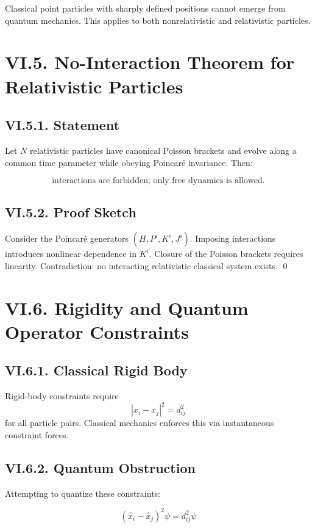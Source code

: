 \documentclass[12pt,oneside]{book}
\theoremstyle{plain}
\theoremstyle{definition}
\begin{document}
Classical point particles with sharply defined positions cannot emerge from quantum mechanics. This applies to both nonrelativistic and relativistic particles.

\section{VI.5. No-Interaction Theorem for Relativistic Particles}

\subsection*{VI.5.1. Statement}

Let $N$ relativistic particles have canonical Poisson brackets and evolve along a common time parameter while obeying Poincaré invariance. Then:

\[
\text{interactions are forbidden; only free dynamics is allowed.}
\]

\subsection*{VI.5.2. Proof Sketch}

Consider the Poincaré generators $(H,P^i,K^i,J^i)$. Imposing interactions introduces nonlinear dependence in $K^i$. Closure of the Poisson brackets requires linearity. Contradiction: no interacting relativistic classical system exists. \qed

\section{VI.6. Rigidity and Quantum Operator Constraints}

\subsection*{VI.6.1. Classical Rigid Body}

Rigid-body constraints require
\[
|x_i - x_j|^2 = d_{ij}^2
\]
for all particle pairs. Classical mechanics enforces this via instantaneous constraint forces.

\subsection*{VI.6.2. Quantum Obstruction}

Attempting to quantize these constraints:

\[
(\widehat{x}_i - \widehat{x}_j)^2 \psi = d_{ij}^2 \psi
\]
\end{document}
